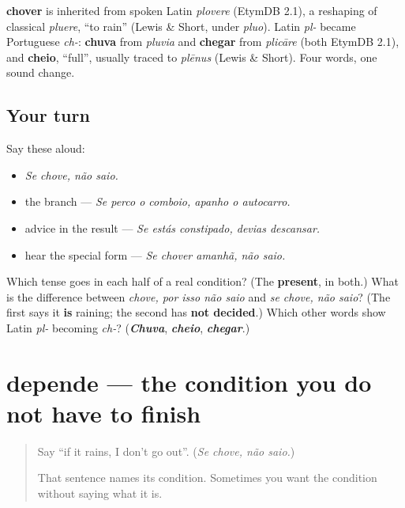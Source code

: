 \begin{cousinweb}
\textbf{chover} is inherited from spoken Latin \emph{plovere} (EtymDB 2.1), a reshaping of classical \emph{pluere}, \textquotedblleft{}to rain\textquotedblright{} (Lewis \& Short, under \emph{pluo}). Latin \emph{pl-} became Portuguese \emph{ch-}: \textbf{chuva} from \emph{pluvia} and \textbf{chegar} from \emph{plicāre} (both EtymDB 2.1), and \textbf{cheio}, \textquotedblleft{}full\textquotedblright{}, usually traced to \emph{plēnus} (Lewis \& Short). Four words, one sound change.
\end{cousinweb}

\subsection*{Your turn}
Say these aloud:

\begin{itemize}
\raggedright
  \item \emph{Se chove, não saio.}
  \item the branch — \emph{Se perco o comboio, apanho o autocarro.}
  \item advice in the result — \emph{Se estás constipado, devias descansar.}
  \item hear the special form — \emph{Se chover amanhã, não saio.}
\end{itemize}

\begin{tcolorbox}[breakable,colback=teal!4,colframe=teal!35!black,title={Before you move on}]
Which tense goes in each half of a real condition? (The \textbf{present}, in both.) What is the difference between \emph{chove, por isso não saio} and \emph{se chove, não saio}? (The first says it \textbf{is} raining; the second has \textbf{not decided}.) Which other words show Latin \emph{pl-} becoming \emph{ch-}? (\emph{\textbf{Chuva}}, \emph{\textbf{cheio}}, \emph{\textbf{chegar}}.)
\end{tcolorbox}
\section[depende]{depende — the condition you do not have to finish}

\label{lesson:PT-C267-depende}



\begin{quote}
Say \textquotedblleft{}if it rains, I don't go out\textquotedblright{}. (\emph{Se chove, não saio.})

That sentence names its condition. Sometimes you want the condition without saying what it is.
\end{quote}

